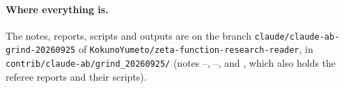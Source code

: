 \paragraph{Where everything is.} The notes, reports, scripts and outputs are on the branch \texttt{claude/claude-ab-grind-20260925} of \texttt{KokunoYumeto/zeta-function-research-reader}, in \texttt{contrib/claude-ab/grind\_20260925/} (notes --, --, and , which also holds the referee reports and their scripts).
